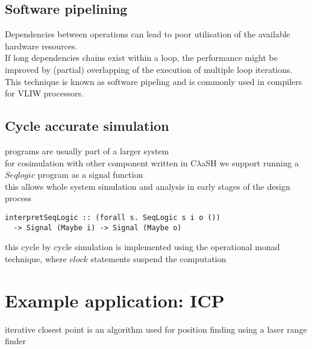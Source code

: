 \documentclass[preprint]{sigplanconf}
\def\codesmall{\sffamily\small}
\def\clash{C$\lambda$aSH\xspace}
\begin{document}
\subsection{Software pipelining}
Dependencies between operations can lead to poor utilisation of the available hardware resources.\\
If long dependencies chains exist within a loop, the performance might be improved by (partial) overlapping of the execution of multiple loop iterations. \\
This technique is known as software pipeling and is commonly used in compilers for VLIW processors.

\subsection{Cycle accurate simulation}
programs are usually part of a larger system \\
for cosimulation with other component written in \clash we support running a $Seqlogic$ program as a signal function \\
this allows whole system simulation and analysis in early stages of the design process
\begin{lstlisting}
interpretSeqLogic :: (forall s. SeqLogic s i o ())
  -> Signal (Maybe i) -> Signal (Maybe o)
\end{lstlisting}
this cycle by cycle simulation is implemented using the operational monad technique, where $clock$ statements suspend the computation

\section{Example application: ICP}
iterative closest point is an algorithm used for position finding using a laser range finder \cite{Robin:Hendrik}

\lstset{basicstyle=\codesmall}
\end{document}
